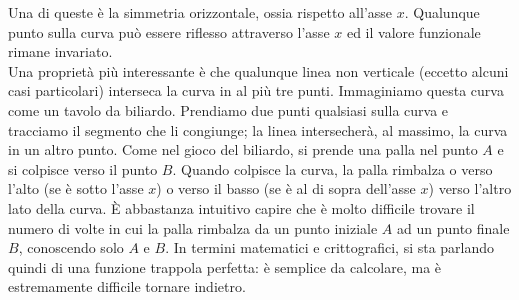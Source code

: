 Una di queste è la simmetria orizzontale, ossia rispetto all'asse $x$. Qualunque punto sulla curva può essere riflesso attraverso l'asse $x$ ed il valore funzionale rimane invariato.\\
Una proprietà più interessante è che qualunque linea non verticale (eccetto alcuni casi particolari) interseca la curva in al più tre punti. Immaginiamo questa curva come un tavolo da biliardo. Prendiamo due punti qualsiasi sulla curva e tracciamo il segmento che li congiunge; la linea intersecherà, al massimo, la curva in un altro punto. Come nel gioco del biliardo, si prende una palla nel punto $A$ e si colpisce verso il punto $B$. Quando colpisce la curva, la palla rimbalza o verso l'alto (se è sotto l'asse $x$) o verso il basso (se è al di sopra dell'asse $x$) verso l'altro lato della curva. È abbastanza intuitivo capire che è molto difficile trovare il numero di volte in cui la palla rimbalza da un punto iniziale $A$ ad un punto finale $B$, conoscendo solo $A$ e $B$. In termini matematici e crittografici, si sta parlando quindi di una funzione trappola perfetta: è semplice da calcolare, ma è estremamente difficile tornare indietro.

